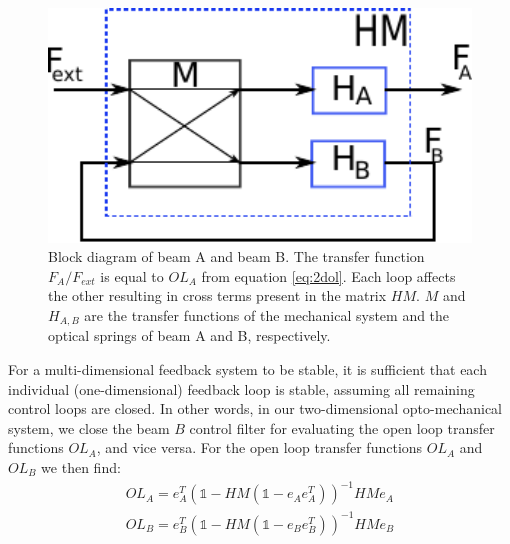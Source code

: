\begin{figure}[htbp]
		\includegraphics[width=15cm]{./figures/block_mimo_paper.pdf}
	\caption[Block Diagram of Optical Trap Beams]{Block diagram of beam A and beam B. The transfer function $F_A/F_{ext}$ is equal to $OL_A$ from equation \ref{eq:2dol}. Each loop affects the other resulting in cross terms
	present in the matrix $HM$. $M$ and $H_{A,B}$ are the transfer functions of the mechanical system and the optical springs of beam A and B, respectively.}
	\label{fig:block_loops}
\end{figure}


For a multi-dimensional feedback system to be stable, it is sufficient that each individual (one-dimensional) feedback loop is stable, assuming all remaining control loops are closed. In other words, in our two-dimensional opto-mechanical system, we close the beam $B$ control filter for evaluating the open loop transfer functions $OL_{A}$, and vice versa. For the open loop transfer functions $OL_{A}$ and $OL_{B}$ we then find: 
\begin{eqnarray}
\label{eq:2dol}
OL_{A}=e_A^{T}\left(\mathds{1}-HM (\mathds{1} - e_A e_A^T) \right)^{-1}HMe_A  \\
OL_{B}=e_B^{T}\left(\mathds{1}-HM (\mathds{1} - e_B e_B^T) \right)^{-1}HMe_B \nonumber
\end{eqnarray}


